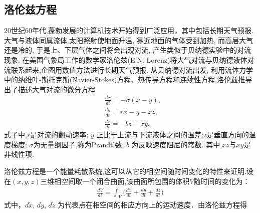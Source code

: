 \subsection{洛伦兹方程}

20世纪60年代,蓬勃发展的计算机技术开始得到广泛应用，其中包括长期天气预报. 大气与液体同属流体,太阳照射使地面升温, 靠近地面的气体受到加热, 而高层大气还是冷的, 于是上、下层气体之间将会出现对流, 产生类似于贝纳德实验中的对流现象. 在美国气象局工作的数学家洛伦兹(E.N. Lorenz)将大气对流与贝纳德液体对流联系起来,企图用数值方法进行长期天气预报. 从贝纳德对流出发, 利用流体力学中的纳维叶-斯托克斯(Navier-Stokes)方程、热传导方程和连续性方程,洛伦兹推导出了描述大气对流的微分方程
\begin{align}
&\frac{dx}{dt}=-\sigma (x-y),\\
&\frac{dy}{dt}=rx-y-xz,\\
&\frac{dz}{dt}=-bz+xy,
\end{align}
式子中,$r$是对流的翻动速率; $y$ 正比于上流与下流液体之间的温差;$z$是垂直方向的温度梯度; $\sigma$为无量纲因子,称为Prandtl数; $b$ 为反映速度阻尼的常数. 其中,$xz$与$xy$是非线性项.

洛伦兹方程是一个能量耗散系统,这可以从它的相空间随时间变化的特性来证明.设在$(x,y, z)$三维相空间取一个闭合曲面,该曲面所包围的体积$V$随时间的变化为：
\begin{align}
\frac{dV}{dt}=\int_V \Big(\frac{d\dot{x}}{dt}+\frac{d\dot{y}}{dt}+\frac{d\dot{z}}{dt}\Big)
\end{align}
式中，$d\dot{x}$, $d\dot{y}$, $d\dot{z}$ 为代表点在相空间的相应方向上的运动速度．由洛伦兹方程得
